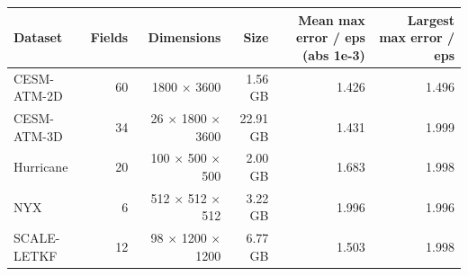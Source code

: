 \begin{tabular}{lrrrrr}
\toprule
\textbf{Dataset} & \textbf{Fields} & \textbf{Dimensions} & \textbf{Size} & \textbf{Mean max error / eps (abs 1e-3)} & \textbf{Largest max error / eps} \\
\midrule
CESM-ATM-2D & 60 & 1800 $\times$ 3600 & 1.56 GB & 1.426 & 1.496 \\
CESM-ATM-3D & 34 & 26 $\times$ 1800 $\times$ 3600 & 22.91 GB & 1.431 & 1.999 \\
Hurricane & 20 & 100 $\times$ 500 $\times$ 500 & 2.00 GB & 1.683 & 1.998 \\
NYX & 6 & 512 $\times$ 512 $\times$ 512 & 3.22 GB & 1.996 & 1.996 \\
SCALE-LETKF & 12 & 98 $\times$ 1200 $\times$ 1200 & 6.77 GB & 1.503 & 1.998 \\
\bottomrule
\end{tabular}

